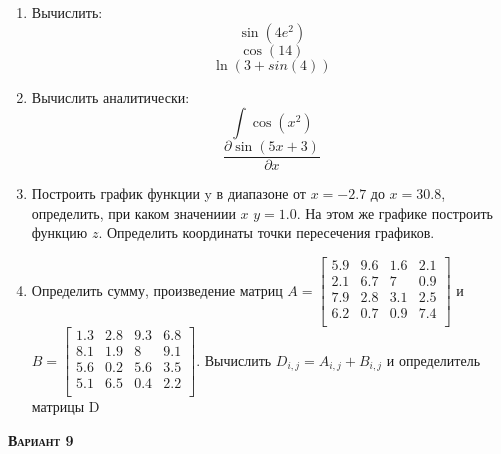 \begin{enumerate}
\item Вычислить: 
\begin{equation*}\sin(4 e^2)                       \end{equation*}
\begin{equation*}\cos(14)                          \end{equation*}
\begin{equation*}\ln(3+sin(4))                     \end{equation*}

\item Вычислить аналитически: 
 \begin{equation*} \int \cos(x^2)          \end{equation*}\begin{equation*} {\dfrac{\partial \sin(5 x +3)}{\partial x}} \end{equation*}
\item Построить график функции y в диапазоне от $x=-2.7$ до $x=30.8$, определить, при каком значениии $x$ $y=1.0$. На этом же графике построить функцию $z $. Определить координаты точки пересечения графиков. \item Определить сумму, произведение матриц $A=\begin{bmatrix}
5.9 &9.6 &1.6 &2.1 \\
2.1 &6.7 &7 &0.9 \\
7.9 &2.8 &3.1 &2.5 \\
6.2 &0.7 &0.9 &7.4 \\
\end{bmatrix}
$ и $B=\begin{bmatrix}
1.3 &2.8 &9.3 &6.8 \\
8.1 &1.9 &8 &9.1 \\
5.6 &0.2 &5.6 &3.5 \\
5.1 &6.5 &0.4 &2.2 \\
\end{bmatrix}
$. Вычислить $D_{i,j}=A_{i,j} + B_{i,j}$ и определитель матрицы D
\end{enumerate}
\textsc{\textbf{Вариант 9}}

